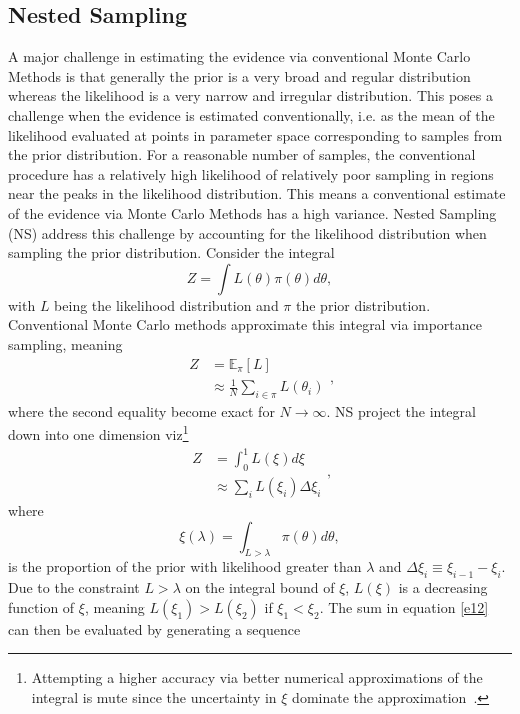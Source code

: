 \documentclass[fleqn,usenatbib,nofootinbib]{revtex4-2}
\begin{document}
\begin{appendices}
		
		\section{Nested Sampling}
		\label{app:NS}
		A major challenge in estimating the evidence via conventional Monte Carlo Methods is that generally the prior is a very broad and regular distribution whereas the likelihood is a very narrow and irregular distribution. This poses a challenge when the evidence is estimated conventionally, i.e. as the mean of the likelihood evaluated at points in parameter space corresponding to samples from the prior distribution. For a reasonable number of samples, the conventional procedure has a relatively high likelihood of relatively poor sampling in regions near the peaks in the likelihood distribution. This means a conventional estimate of the evidence via Monte Carlo Methods has a high variance. Nested Sampling~\citep{skilling2004} (NS) address this challenge by accounting for the likelihood distribution when sampling the prior distribution. Consider the integral
		\begin{equation}
			Z  = \int L(\theta)\pi(\theta)d\theta,
		\end{equation}
		with $L$ being the likelihood distribution and $\pi$ the prior distribution. Conventional Monte Carlo methods approximate this integral via importance sampling, meaning
		\begin{equation}
			\begin{split}
				Z &= \mathbb{E}_\pi[L]\\
				&\approx \frac{1}{N}\sum_{i\in \pi}L(\theta_i)
			\end{split},
		\end{equation}
		where the second equality become exact for $N\rightarrow \infty$. NS project the integral down into one dimension viz\footnote{Attempting a higher accuracy via better numerical approximations of the integral is mute since the uncertainty in $\xi$ dominate the approximation~\citep{skilling2004}.}
		\begin{equation}
			\begin{split}
				Z &= \int_0^1 L(\xi) d\xi\\
				&\approx \sum_{i}L(\xi_i)\Delta \xi_i
			\end{split},
			\label{e12}
		\end{equation}
		where
		\begin{equation}
			\xi(\lambda) = \int_{L>\lambda} \pi(\theta)d\theta,
		\end{equation}
		is the proportion of the prior with likelihood greater than $\lambda$ and $\Delta \xi_i\equiv \xi_{i-1}-\xi_i$. Due to the constraint $L>\lambda$ on the integral bound of $\xi$, $L(\xi)$ is a decreasing function of $\xi$, meaning $L(\xi_1)>L(\xi_2)$ if $\xi_1<\xi_2$. The sum in equation \eqref{e12} can then be evaluated by generating a sequence

\end{appendices}
\end{document}

